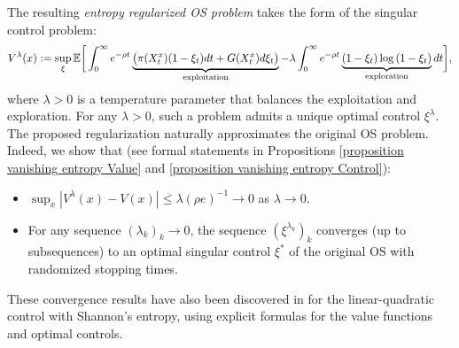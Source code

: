 \documentclass[11pt]{amsart}
\theoremstyle{plain}
\def \dd{{\rm d}}
\numberwithin{equation}{section}
\begin{document}
The resulting \emph{entropy regularized OS problem} takes the form of the singular control problem:
\begin{equation*}
     V^\lambda (x):=\sup _{\xi} \mathbb E \bigg[ \int _0^\infty e ^{-\rho t} \underbrace{\big( \pi (X^x_t) (1-\xi_t) \dd t  + G(X^x_t) \dd \xi_t \big)}_{\text{exploitation}} -\lambda \int_{0}^{\infty} e^{- \rho t} \underbrace {\left(1-\xi_{t}\right) \log \left( 1-\xi_{t} \right)}_{\text{exploration}} \dd t \bigg],
\end{equation*}
where $\lambda>0$ is a temperature parameter that balances the exploitation and exploration.
For any $\lambda >0$, such a problem admits a unique optimal control $\xi^\lambda$.
The proposed regularization naturally approximates the original OS problem. 
Indeed, we show that (see formal statements in Propositions \ref{proposition vanishing entropy Value} and  \ref{proposition vanishing entropy Control}):
 \begin{itemize}
     \item  $
\sup _x | V^\lambda (x) - V (x)| \leq   
  \lambda (\rho e)^{-1} \to 0 $ as $\lambda \to 0$.
  \item For any sequence $(\lambda_k)_k \to 0$, the sequence $(\xi^{\lambda_k})_k$ converges (up to subsequences) to an optimal singular control $\xi^*$ of the original OS with randomized stopping times.
 \end{itemize}
These convergence results have also been discovered in \cite{wang2020reinforcement} for the linear-quadratic control with Shannon's entropy, using explicit formulas for the value functions and optimal controls.
\end{document}

